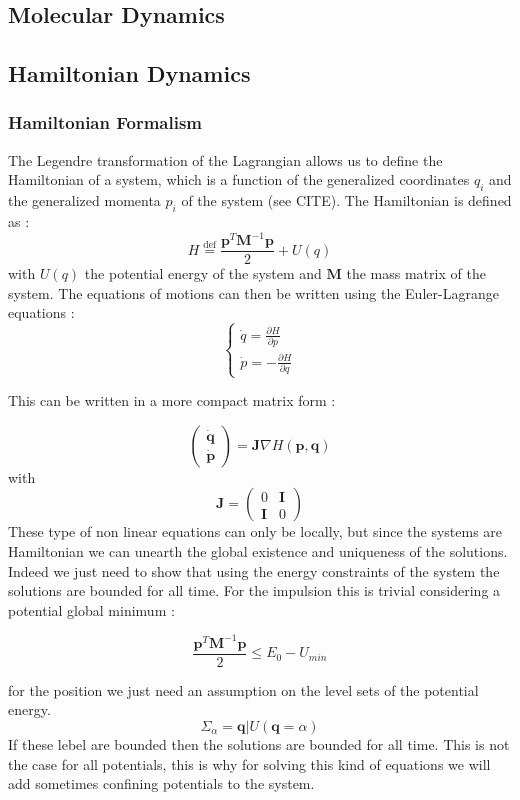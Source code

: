 \documentclass[ansiapaper]{report}
\newcommand*{\defeq}{\stackrel{\text{def}}{=}}
\begin{document}
\begin{multicols}{3}
  \chapter{Molecular Dynamics}
  \section{Hamiltonian Dynamics}
  \subsection{Hamiltonian Formalism}

  The Legendre transformation of the Lagrangian allows us to define the Hamiltonian of a system, which is a function of the generalized coordinates $q_i$ and the generalized momenta $p_i$ of the system (see CITE). The Hamiltonian is defined as :
  $$ H \defeq \frac{\textbf{p} ^T \textbf{M} ^{-1} \textbf{p}  }{2} + U(q)$$
  with $U(q)$ the potential energy of the system and $\textbf{M}$ the mass matrix of the system. The equations of motions can then be written using the Euler-Lagrange equations :
  $$
    \begin{cases}
      \dot{q} = \frac{\partial H}{\partial p} \\
      \dot{p} = -\frac{\partial H}{\partial q}
    \end{cases}
  $$

  This can be written in a more compact matrix form :

  $$ \begin{pmatrix}
      \dot{\textbf{q} } \\
      \dot{\textbf{p} }
    \end{pmatrix} = \textbf{J} \nabla H(\textbf{p} ,\textbf{q} )
  $$
  with $$\textbf{J} = \begin{pmatrix}
      0          & \textbf{I} \\
      \textbf{I} & 0
    \end{pmatrix} $$
  These type of non linear equations can only be locally, but since the systems are Hamiltonian we can unearth the global existence and uniqueness of the solutions. Indeed we just need to show that using the energy constraints of the system the solutions are bounded for all time. For the impulsion this is trivial considering a potential global minimum :

  $$ \frac{\textbf{p}^T \textbf{M} ^{-1} \textbf{p} }{2} \leq E_0 - U_{min}$$

  for the position we just need an assumption on the level sets of the potential energy. $$ \Sigma_{\alpha} = {\textbf{q}|U(\textbf{q} = \alpha) }$$
  If these lebel are bounded then the solutions are bounded for all time. This is not the case for all potentials, this is why for solving this kind of equations we will add sometimes confining potentials to the system.

\end{multicols}
\end{document}
